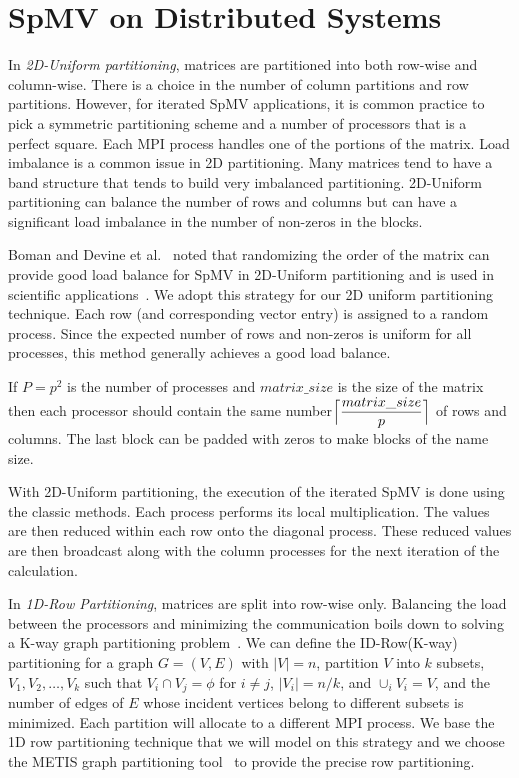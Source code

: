 \documentclass[conference, 10ppt]{IEEEtran}
\begin{document}
\section{SpMV on Distributed Systems}
In \textit{2D-Uniform partitioning},  matrices
are partitioned into both row-wise and column-wise.  There is a choice
in the number of column partitions and row partitions. However, for
iterated SpMV applications, it is common practice to pick a symmetric
partitioning scheme and a number of processors that is a perfect
square. Each MPI process handles one of the portions of the matrix.
Load imbalance is a common issue in 2D partitioning. Many matrices
tend to have a band structure that tends to build very imbalanced
partitioning.  2D-Uniform partitioning can balance the number of rows
and columns but can have a significant load imbalance in the number
of non-zeros in the blocks.

Boman and Devine et al.~\cite{boman2013scalable} noted that
randomizing the order of the matrix can provide good load balance for
SpMV in 2D-Uniform partitioning and is used in scientific
applications~\cite{dytrych2016efficacy}. We adopt this strategy for
our 2D uniform partitioning technique. Each row (and corresponding
vector entry) is assigned to a random process.  Since the expected
number of rows and non-zeros is uniform for all processes, this method
generally achieves a good load balance.

If $P=p^2$ is the number of processes
and $matrix\_size$ is the size of the matrix then each processor
should contain the same
number$\Bigl\lceil\dfrac{matrix\_size}{p}\Bigr\rceil$ of rows and
columns. The last block can be padded with zeros to make blocks of the name size.

With 2D-Uniform partitioning, the execution of the iterated SpMV is
done using the classic methods. Each process performs its local
multiplication. The values are then reduced within each row onto the
diagonal process. These reduced values are then broadcast along with the
column processes for the next iteration of the calculation.

In \textit{1D-Row Partitioning}, matrices are split into row-wise
only. Balancing the load between the processors and minimizing the
communication boils down to solving a K-way graph partitioning
problem~\cite{kaya2013analysis}.  We can define the ID-Row(K-way)
partitioning for a graph $G=(V,E)$ with $|V|=n$, partition $V$ into
$k$ subsets, $V_1, V_2, \dots, V_k$ such that $V_i \cap V_j=\phi$ for
$i\neq j$, $|V_i| = n/k$, and $\cup_i V_i = V$, and the number of
edges of $E$ whose incident vertices belong to different subsets is
minimized. Each partition will allocate to a different MPI
process. We base the 1D row partitioning technique that we will model
on this strategy and we choose the METIS graph partitioning
tool~\cite{karypis1995multilevel} to provide the precise row
partitioning.
\end{document}
